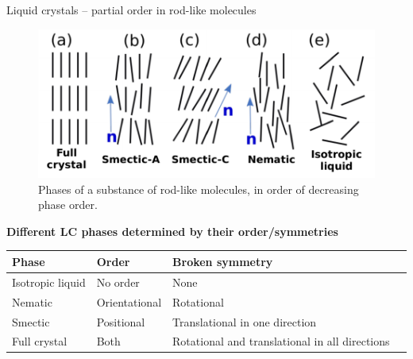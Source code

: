 \documentclass[10pt,mathserif]{beamer}
\begin{document}
\begin{frame}[fragile]{Liquid crystals -- partial order in rod-like molecules}
    \newrefsection
    \begin{figure}
        \centering
        \includegraphics{figures/phases.pdf}
        \caption{
            Phases of a substance of rod-like molecules, in order of decreasing phase order\cite{pagetComplexTensorsSimple2023}.
        }
    \end{figure}
    \vspace{-0.5em}
    \normalsize\textbf{Different LC phases determined by their order/symmetries}\normalsize
    \vspace{-1.5em}
    \small
    \begin{table}
        \begin{tabular}{llll}
        Phase            & Order & Broken symmetry &  \\
        \hline
        Isotropic liquid & No order  & None &  \\
        Nematic          & Orientational & Rotational &  \\
        Smectic          & Positional & Translational in one direction & \\
        Full crystal     & Both & Rotational and translational in all directions &
        \end{tabular}
    \end{table}
    \vfill
    \printbibliography[heading=none]
    \vspace{-\fill}
\end{frame}
\end{document}
